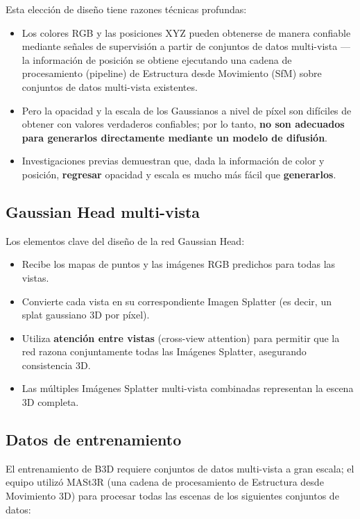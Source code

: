 Esta elección de diseño tiene razones técnicas profundas:

\begin{itemize}
    \item Los colores RGB y las posiciones XYZ pueden obtenerse de manera confiable mediante señales de supervisión a partir de conjuntos de datos multi-vista —la información de posición se obtiene ejecutando una cadena de procesamiento (pipeline) de Estructura desde Movimiento (SfM) sobre conjuntos de datos multi-vista existentes.
    \item Pero la opacidad y la escala de los Gaussianos a nivel de píxel son difíciles de obtener con valores verdaderos confiables; por lo tanto, \textbf{no son adecuados para generarlos directamente mediante un modelo de difusión}.
    \item Investigaciones previas demuestran que, dada la información de color y posición, \textbf{regresar} opacidad y escala es mucho más fácil que \textbf{generarlos}.
\end{itemize}

\subsection{Gaussian Head multi-vista}

Los elementos clave del diseño de la red Gaussian Head:

\begin{itemize}
    \item Recibe los mapas de puntos y las imágenes RGB predichos para todas las vistas.
    \item Convierte cada vista en su correspondiente Imagen Splatter (es decir, un splat gaussiano 3D por píxel).
    \item Utiliza \textbf{atención entre vistas} (cross-view attention) para permitir que la red razona conjuntamente todas las Imágenes Splatter, asegurando consistencia 3D.
    \item Las múltiples Imágenes Splatter multi-vista combinadas representan la escena 3D completa.
\end{itemize}

\subsection{Datos de entrenamiento}

El entrenamiento de B3D requiere conjuntos de datos multi-vista a gran escala; el equipo utilizó MASt3R (una cadena de procesamiento de Estructura desde Movimiento 3D) para procesar todas las escenas de los siguientes conjuntos de datos:

